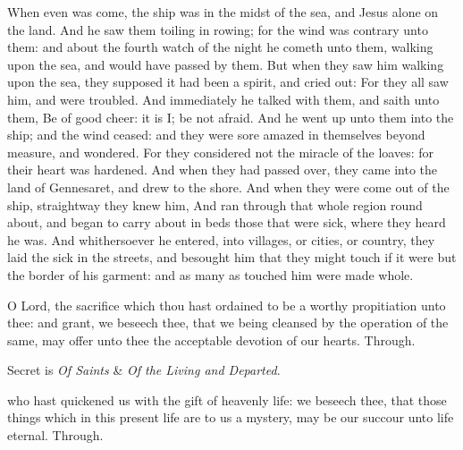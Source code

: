 

 When even was come, the ship was in the midst of the sea, and Jesus alone on the land. And he saw them toiling in rowing; for the wind was contrary unto them: and about the fourth watch of the night he cometh unto them, walking upon the sea, and would have passed by them. But when they saw him walking upon the sea, they supposed it had been a spirit, and cried out: For they all saw him, and were troubled. And immediately he talked with them, and saith unto them, Be of good cheer: it is I; be not afraid. And he went up unto them into the ship; and the wind ceased: and they were sore amazed in themselves beyond measure, and wondered. For they considered not the miracle of the loaves: for their heart was hardened. And when they had passed over, they came into the land of Gennesaret, and drew to the shore. And when they were come out of the ship, straightway they knew him, And ran through that whole region round about, and began to carry about in beds those that were sick, where they heard he was. And whithersoever he entered, into villages, or cities, or country, they laid the sick in the streets, and besought him that they might touch if it were but the border of his garment: and as many as touched him were made whole.


\secret
{} O Lord, the sacrifice which thou hast ordained to be a worthy propitiation unto thee: and grant, we beseech thee, that we being cleansed by the operation of the same, may offer unto thee the acceptable devotion of our hearts. Through.

\begin{rubric}
     Secret is \emph{Of Saints} \&  \emph{Of the Living and Departed}.
\end{rubric}


\postcommunion
{} who hast quickened us with the gift of heavenly life: we beseech thee, that those things which in this present life are to us a mystery, may be our succour unto life eternal. Through.

